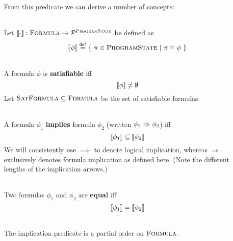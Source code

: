 \begin{description}
    From this predicate we can derive a number of concepts:
    
    \begin{definition}~\\
        \label{def:frm-den-sem}
        Let $\llbracket {\cdot} \rrbracket : \textup{\textsc{Formula}} \rightarrow \mathcal{P}^{\textup{\textsc{ProgramState}}}$ be defined as
        \begin{displaymath}
        \llbracket {\phi} \rrbracket \overset{\textup{\textmd{\textsf{def}}}}{=} \{~ \pi \in \textup{\textsc{ProgramState}} ~|~ \pi \,\,{\vDash}\,\, \phi ~\}
        \end{displaymath}
    \end{definition}
        
    
    \begin{definition}~\\
        A formula $\phi$ is \textbf{satisfiable} iff $$\llbracket {\phi} \rrbracket \neq \emptyset$$
        Let $\textup{\textsc{SatFormula}} \subseteq \textup{\textsc{Formula}}$ be the set of satisfiable formulas.
    \end{definition}
    
    \begin{definition}~\\
        \label{def:form-implication}
        A formula $\phi_1$ \textbf{implies} formula $\phi_2$ (written ${\phi_1} \,\,{\Rightarrow}\,\, {\phi_2}$) iff
        \begin{displaymath}
        \llbracket {\phi_1} \rrbracket \subseteq \llbracket {\phi_2} \rrbracket
        \end{displaymath}
        We will consistently use $\implies$ to denote logical implication, whereas $\Rightarrow$ exclusively denotes formula implication as defined here.
        (Note the different lengths of the implication arrows.)
    \end{definition}
    
    \begin{definition}~\\
        \label{def:form-eq}
        Two formulas $\phi_1$ and $\phi_2$ are \textbf{equal} iff
        \begin{displaymath}
        \llbracket {\phi_1} \rrbracket = \llbracket {\phi_2} \rrbracket
        \end{displaymath}
    \end{definition}
    
    \begin{lemma}
        \label{lemma:po-form}~\\
        The implication predicate is a partial order on $\textup{\textsc{Formula}}$.
    \end{lemma}
    

\end{description}

